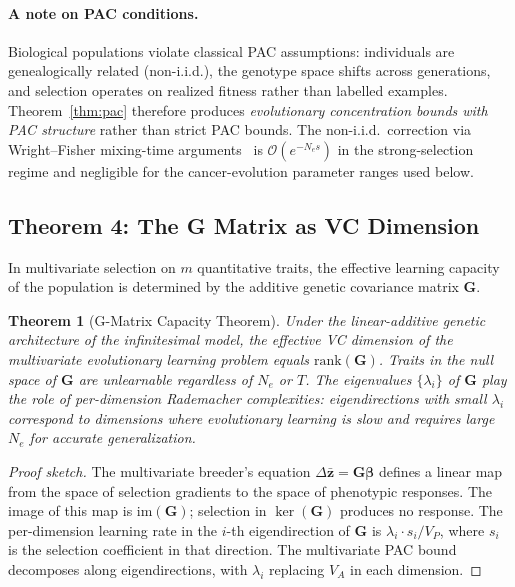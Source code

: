 \documentclass[12pt]{article}
\newtheorem{theorem}{Theorem}
\theoremstyle{remark}
\begin{document}
\paragraph{A note on PAC conditions.} Biological populations violate classical PAC assumptions: individuals are genealogically related (non-i.i.d.), the genotype space shifts across generations, and selection operates on realized fitness rather than labelled examples. Theorem~\ref{thm:pac} therefore produces \emph{evolutionary concentration bounds with PAC structure} rather than strict PAC bounds. The non-i.i.d.\ correction via Wright--Fisher mixing-time arguments~\cite{yu1994} is $\mathcal{O}(e^{-N_e s})$ in the strong-selection regime and negligible for the cancer-evolution parameter ranges used below.

\subsection{Theorem 4: The G Matrix as VC Dimension}

In multivariate selection on $m$ quantitative traits, the effective learning capacity of the population is determined by the additive genetic covariance matrix $\mathbf{G}$.

\begin{theorem}[G-Matrix Capacity Theorem]
Under the linear-additive genetic architecture of the infinitesimal model, the effective VC dimension of the multivariate evolutionary learning problem equals $\mathrm{rank}(\mathbf{G})$. Traits in the null space of $\mathbf{G}$ are unlearnable regardless of $N_e$ or $T$. The eigenvalues $\{\lambda_i\}$ of $\mathbf{G}$ play the role of per-dimension Rademacher complexities: eigendirections with small $\lambda_i$ correspond to dimensions where evolutionary learning is slow and requires large $N_e$ for accurate generalization.
\end{theorem}

\begin{proof}[Proof sketch]
The multivariate breeder's equation $\Delta\bar{\mathbf{z}} = \mathbf{G}\boldsymbol{\beta}$ defines a linear map from the space of selection gradients to the space of phenotypic responses. The image of this map is $\mathrm{im}(\mathbf{G})$; selection in $\ker(\mathbf{G})$ produces no response. The per-dimension learning rate in the $i$-th eigendirection of $\mathbf{G}$ is $\lambda_i \cdot s_i / V_P$, where $s_i$ is the selection coefficient in that direction. The multivariate PAC bound decomposes along eigendirections, with $\lambda_i$ replacing $V_A$ in each dimension.
\end{proof}
\end{document}

